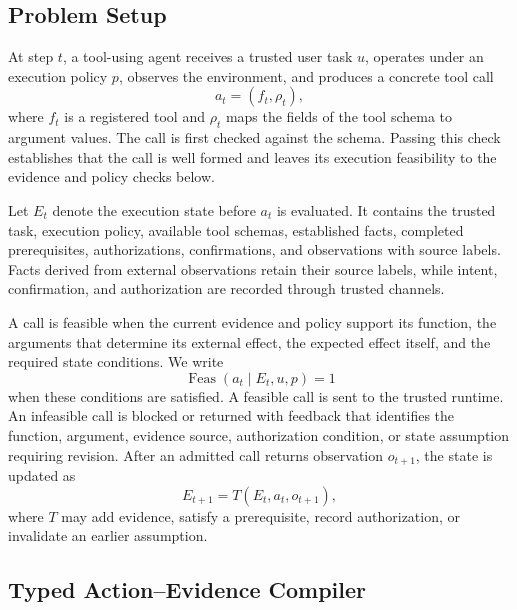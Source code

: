 \documentclass[letterpaper]{article}
\begin{document}
\subsection{Problem Setup}

At step $t$, a tool-using agent receives a trusted user task $u$, operates under an execution policy $p$, observes the environment, and produces a concrete tool call
\begin{equation}
 a_t=(f_t,\rho_t),
 \label{eq:tool-call}
\end{equation}
where $f_t$ is a registered tool and $\rho_t$ maps the fields of the tool schema to argument values. The call is first checked against the schema. Passing this check establishes that the call is well formed and leaves its execution feasibility to the evidence and policy checks below.

Let $E_t$ denote the execution state before $a_t$ is evaluated. It contains the trusted task, execution policy, available tool schemas, established facts, completed prerequisites, authorizations, confirmations, and observations with source labels. Facts derived from external observations retain their source labels, while intent, confirmation, and authorization are recorded through trusted channels.

A call is feasible when the current evidence and policy support its function, the arguments that determine its external effect, the expected effect itself, and the required state conditions. We write
\begin{equation}
 \operatorname{Feas}(a_t\mid E_t,u,p)=1
 \label{eq:feasibility}
\end{equation}
when these conditions are satisfied. A feasible call is sent to the trusted runtime. An infeasible call is blocked or returned with feedback that identifies the function, argument, evidence source, authorization condition, or state assumption requiring revision. After an admitted call returns observation $o_{t+1}$, the state is updated as
\begin{equation}
 E_{t+1}=T(E_t,a_t,o_{t+1}),
 \label{eq:state-transition}
\end{equation}
where $T$ may add evidence, satisfy a prerequisite, record authorization, or invalidate an earlier assumption.

\subsection{Typed Action--Evidence Compiler}
\end{document}
